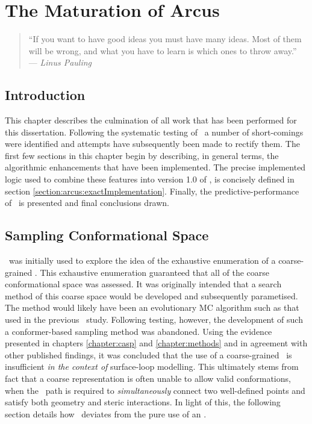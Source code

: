 \chapter{The Maturation of Arcus}
\label{chapter:arcus}

\begin{quote}
``If you want to have good ideas you must have many ideas. Most of them will be wrong, and what you have to learn is which ones to throw away.'' \\
--- \textit{Linus Pauling}
\end{quote}

\section{Introduction}

This chapter describes the culmination of all work that has been performed for this dissertation. Following the systematic testing of \prearcus\ a number of short-comings were identified and attempts have subsequently been made to rectify them. The first few sections in this chapter begin by describing, in general terms, the algorithmic enhancements that have been implemented. The precise implemented logic used to combine these features into version 1.0 of \arcus,  is concisely defined  in section \ref{section:arcus:exactImplementation}. Finally, the predictive-performance of \arcus\ is presented and final conclusions drawn.


\section{Sampling Conformational Space}

\prearcus\ was initially used to explore the idea of the exhaustive enumeration of a coarse-grained \angleset. This exhaustive enumeration guaranteed that all of the coarse conformational space was assessed. It was originally intended that a search method of this coarse space would be developed and subsequently parametised. The method would likely have been an evolutionary MC algorithm such as that used in the previous \raft\ study\cite{COMPCHEM:Gib2001}. Following testing, however, the development of such a conformer-based sampling method was abandoned. Using the evidence presented in chapters \ref{chapter:casp} and \ref{chapter:methods} and in agreement with other published findings\cite{METHOD:Plop,METHOD:RapperB}, it was concluded that the use of a coarse-grained \angleset\ is insufficient \emph{in the context of} surface-loop modelling. This ultimately stems from fact that a coarse representation is often unable to allow valid conformations, when the \mainchain\ path is required to \emph{simultaneously} connect two well-defined points and satisfy both geometry and steric interactions.
In light of this, the following section details how \arcus\ deviates from the pure use of an \angleset.

